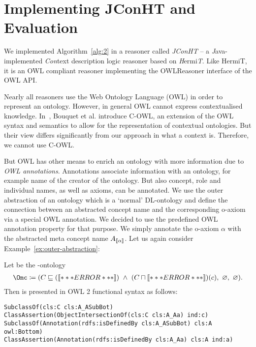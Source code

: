 \section{Implementing JConHT and Evaluation}
\label{sec:implementing-jconht}

We implemented Algorithm~\ref{alg:2} in a reasoner called \emph{JConHT} -- a \emph{J}ava-implemented
\emph{Con}text description logic reasoner based on \emph{H}ermi\emph{T}. Like HermiT, it is an OWL
compliant reasoner implementing the \textsf{OWLReasoner} interface of the OWL API.

Nearly all reasoners use the Web Ontology Language (OWL) in order to represent an ontology.
However, in general OWL cannot express contextualised knowledge. In~\cite{BoGH-ISWC03}, Bouquet et
al. introduce C-OWL, an extension of the OWL syntax and semantics to allow for the representation of
contextual ontologies. But their view differs significantly from our approach in what a context is.
Therefore, we cannot use C-OWL.

But OWL has other means to enrich an ontology with more information due to \emph{OWL
  annotations}. Annotations associate information with an ontology, for example name of the creator
of the ontology. But also concept, role and individual names, as well as axioms, can be annotated. We use the
outer abstraction of an ontology which is a `normal' DL-ontology and define the connection between
an abstracted concept name and the corresponding o-axiom via a special OWL annotation. We decided to
use the predefined OWL annotation property \rdfsIsDefinedBy for that purpose. We simply
annotate the o-axiom $\alpha$ with the abstracted meta concept name $A_{\llbracket\alpha\rrbracket}$.
%
Let us again consider Example~\ref{ex:outer-abstraction}:
\begin{example}\label{ex:outer-abstraction-as-OWL}
  Let \Omc be the \ALCALC-ontology
  \begin{align*}
    \Omc \coloneqq (C\sqsubseteq(\oax{A\sqsubseteq\bot})\ \land\ (C\sqcap\oax{A(a)})(c),\ \emptyset,\ \emptyset).
  \end{align*}
Then \Omc is presented in OWL 2 functional syntax as follows:

\smallskip\noindent
\verb+SubclassOf(cls:C cls:A_ASubBot)+\\
\verb+ClassAssertion(ObjectIntersectionOf(cls:C cls:A_Aa) ind:c)+\\
\verb+SubclassOf(Annotation(rdfs:isDefinedBy cls:A_ASubBot) cls:A owl:Bottom)+\\
\verb+ClassAssertion(Annotation(rdfs:isDefinedBy cls:A_Aa) cls:A ind:a)+
\end{example}

